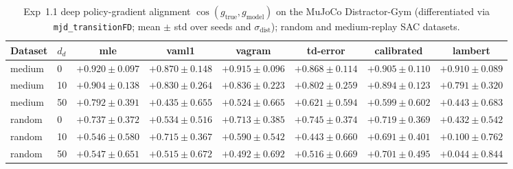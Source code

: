 \begin{table}[t]
\centering
\small
\caption{Exp~1.1 deep policy-gradient alignment $\cos(g_{\text{true}}, g_{\text{model}})$ on the MuJoCo Distractor-Gym (differentiated via \texttt{mjd\_transitionFD}; mean $\pm$ std over seeds and $\sigma_{\text{dist}}$); random and medium-replay SAC datasets.}\label{tab:h11}
\begin{tabular}{llcccccc}
\toprule
Dataset & $d_d$ & mle & vaml1 & vagram & td-error & calibrated & lambert \\
\midrule
medium & 0 & $+0.920\pm0.097$ & $+0.870\pm0.148$ & $+0.915\pm0.096$ & $+0.868\pm0.114$ & $+0.905\pm0.110$ & $+0.910\pm0.089$ \\
medium & 10 & $+0.904\pm0.138$ & $+0.830\pm0.264$ & $+0.836\pm0.223$ & $+0.802\pm0.259$ & $+0.894\pm0.123$ & $+0.791\pm0.320$ \\
medium & 50 & $+0.792\pm0.391$ & $+0.435\pm0.655$ & $+0.524\pm0.665$ & $+0.621\pm0.594$ & $+0.599\pm0.602$ & $+0.443\pm0.683$ \\
random & 0 & $+0.737\pm0.372$ & $+0.534\pm0.516$ & $+0.713\pm0.385$ & $+0.745\pm0.374$ & $+0.719\pm0.369$ & $+0.432\pm0.542$ \\
random & 10 & $+0.546\pm0.580$ & $+0.715\pm0.367$ & $+0.590\pm0.542$ & $+0.443\pm0.660$ & $+0.691\pm0.401$ & $+0.100\pm0.762$ \\
random & 50 & $+0.547\pm0.651$ & $+0.515\pm0.672$ & $+0.492\pm0.692$ & $+0.516\pm0.669$ & $+0.701\pm0.495$ & $+0.044\pm0.844$ \\
\bottomrule
\end{tabular}
\end{table}

